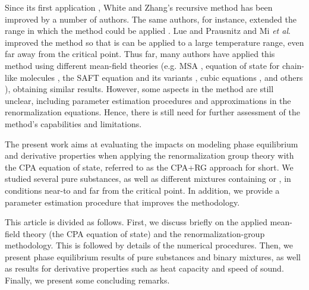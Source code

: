 \documentclass[preprint,12pt,3p]{elsarticle}
\begin{document}
Since its first application \citep{white1993renormalization}, White and Zhang’s recursive method has been improved by a number of authors.
The same authors, for instance, extended the range in which the method could be applied \cite{white1998renormalization}.
Lue and Prausnitz \cite{lue1998renormalization, lue1998brenormalization} and Mi \textit{et al}. \cite{mi2004improved} improved the method so that is can be applied to a large temperature range, even far away from the critical point.
Thus far, many authors have applied this method using different mean-field theories (e.g.
MSA \citep{lue1998renormalization}, equation of state for chain-like molecules \cite{jiang1999equation, jiang2000phase}, the SAFT equation and its variants \cite{llovell2004thermodynamic, forte2011application, bymaster2008renormalization, tang2010renormalization, llovell2006global, forte2013application, dias2009thermodynamic, llovell2006second, llovell2006prediction, llovell2007phase}, cubic equations \cite{xu2011prediction,xu2010crossover,pcm2017application,llovell2008accurate,qiu2006vapor,cai2006vapor,cai2004thermodynamics}, and others \cite{ghobadi2013renormalization,choi2016renormalization}), obtaining similar results.
However, some aspects in the method are still unclear, including parameter estimation procedures and approximations in the renormalization equations.
Hence, there is still need for further assessment of the method's capabilities and limitations.

The present work aims at evaluating the impacts on modeling phase equilibrium and derivative properties when applying the renormalization group theory with the CPA equation of state, referred to as the CPA+RG approach for short.
We studied several pure substances, as well as different mixtures containing  or , in conditions near-to and far from the critical point.
In addition, we provide a parameter estimation procedure that improves the methodology.

This article is divided as follows.
First, we discuss briefly on the applied mean-field theory (the CPA equation of state) and the renormalization-group methodology.
This is followed by details of the numerical procedures.
Then, we present phase equilibrium results of pure substances and binary mixtures, as well as results for derivative properties such as heat capacity and speed of sound.
Finally, we present some concluding remarks.
\end{document}
